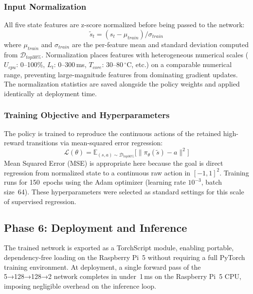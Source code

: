 \documentclass{ieeeaccess}
\begin{document}
\subsubsection*{Input Normalization}

All five state features are z-score normalized before being passed to the
network:
\begin{equation}
\tilde{s}_t = (s_t - \mu_{train}) / \sigma_{train}
\end{equation}
where $\mu_{train}$ and $\sigma_{train}$ are the per-feature mean and
standard deviation computed from $\mathcal{D}_{top30\%}$. Normalization
places features with heterogeneous numerical scales ($U_{cpu}$: 0--100\%,
$L_t$: 0--300\,ms, $T_{core}$: 30--80\,$^\circ$C, etc.) on a comparable
numerical range, preventing large-magnitude features from dominating
gradient updates. The normalization statistics are saved alongside the
policy weights and applied identically at deployment time.

\subsubsection*{Training Objective and Hyperparameters}

The policy is trained to reproduce the continuous actions of the
retained high-reward transitions via mean-squared error regression:
\begin{equation}
\mathcal{L}(\theta) = \mathbb{E}_{(s,a)\sim\mathcal{D}_{top30\%}}
\bigl[\|\pi_\theta(\tilde{s}) - a\|^2\bigr]
\end{equation}
Mean Squared Error (MSE) is appropriate here because the goal is direct regression from
normalized state to a continuous raw action in $[-1,1]^2$. Training runs
for 150~epochs using the Adam optimizer (learning rate $10^{-3}$, batch
size~64). These hyperparameters were selected as standard settings for this
scale of supervised regression.

\subsection{Phase 6: Deployment and Inference}

The trained network is exported as a TorchScript module, enabling
portable, dependency-free loading on the Raspberry Pi~5 without requiring
a full PyTorch training environment. At deployment, a single forward pass
of the 5→128→128→2 network completes in under~1\,ms on the Raspberry Pi~5
CPU, imposing negligible overhead on the inference loop.
\end{document}
